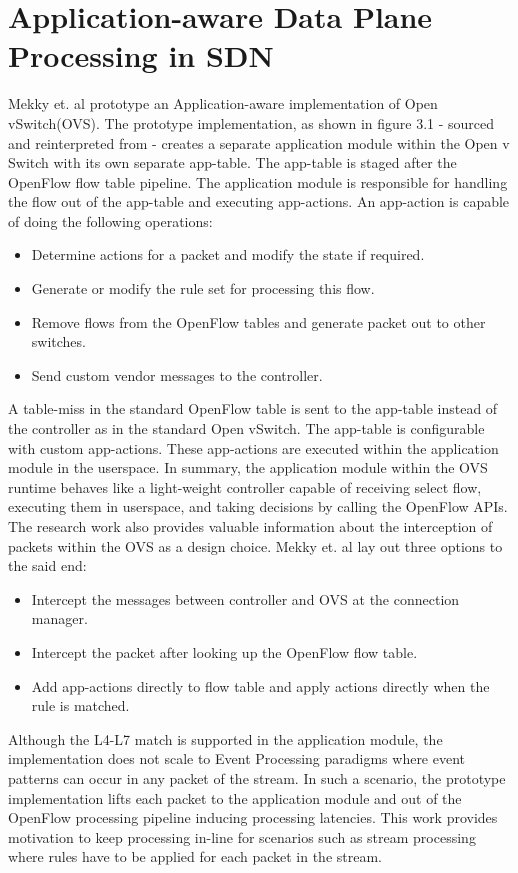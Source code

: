 \section{Application-aware Data Plane Processing in SDN}
Mekky et. al \cite{mekky2014application} prototype an Application-aware implementation of Open vSwitch(OVS). The prototype implementation, as shown in figure 3.1 - sourced and reinterpreted from \cite{mekky2014application} -  creates a separate application module within the Open v Switch with its own separate app-table. The app-table is staged after the OpenFlow flow table pipeline. The application module is responsible for handling the flow out of the app-table and executing app-actions. An app-action is capable of doing the following operations:
\begin{itemize}
\item Determine actions for a packet and modify the state if required.
\item Generate or modify the rule set for processing this flow.
\item Remove flows from the OpenFlow tables and generate packet out to other switches.
\item Send custom vendor messages to the controller.
\end{itemize}
A table-miss in the standard OpenFlow table is sent to the app-table instead of the controller as in the standard Open vSwitch. The app-table is configurable with custom app-actions. These app-actions are executed within the application module in the userspace. In summary, the application module within the OVS runtime behaves like a light-weight controller capable of receiving select flow, executing them in userspace, and taking decisions by calling the OpenFlow APIs. The research work also provides valuable information about the interception of packets within the OVS as a design choice. Mekky et. al lay out three options to the said end:
\begin{itemize}
 \item Intercept the messages between controller and OVS at the connection manager.
 \item Intercept the packet after looking up the OpenFlow flow table.
 \item Add app-actions directly to flow table and apply actions directly when the rule is matched.
\end{itemize}
 Although the L4-L7 match is supported in the application module, the implementation does not scale to Event Processing paradigms where event patterns can occur in any packet of the stream. In such a scenario, the prototype implementation lifts each packet to the application module and out of the OpenFlow processing pipeline inducing processing latencies. This work provides motivation to keep processing in-line for scenarios such as stream processing where rules have to be applied for each packet in the stream.


